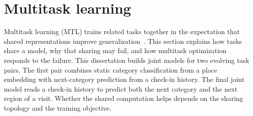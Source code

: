 

\section{Multitask learning}
\label{sec:fund:mtl}

Multitask learning (MTL) trains related tasks together in the expectation that shared representations improve
generalization~\cite{caruana1997multitask}. This section explains how tasks share a model,
why that sharing may fail, and how multitask optimization responds to
the failure. This dissertation builds joint models for two evolving task pairs. The first pair combines static category
classification from a place embedding with next-category prediction from a check-in history. The final joint model
reads a check-in history to predict both the next category and the next region of a visit. Whether the shared
computation helps depends on the sharing topology and the training objective.

